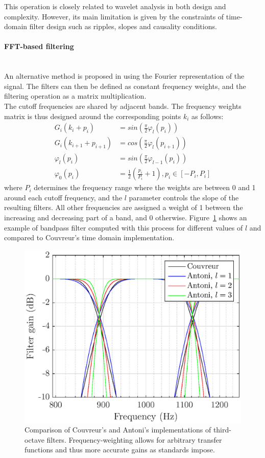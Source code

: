 \documentclass[12pt,times,onecolumn]{article}
\begin{document}
This operation is closely related to wavelet analysis in both design and complexity. However, its main limitation is given by the constraints of time-domain filter design such as ripples, slopes and causality conditions.

\paragraph{FFT-based filtering\\\\}
An alternative method is proposed in \cite{antoni2010} using the Fourier representation of the signal. The filters can then be defined as constant frequency weights, and the filtering operation as a matrix multiplication.\\

The cutoff frequencies are shared by adjacent bands. The frequency weights matrix is thus designed around the corresponding points $k_i$ as follows:
\begin{align}
G_i(k_i+p_i) &= sin\left(\frac{\pi}{2}\varphi_l(p_i)\right)\\
G_i(k_{i+1}+p_{i+1}) &= cos\left(\frac{\pi}{2}\varphi_l(p_{i+1})\right)\\
\varphi_l(p_i) &= sin\left(\frac{\pi}{2}\varphi_{l-1}(p_i)\right)\\
\varphi_0(p_i) &= \frac{1}{2}\left(\frac{p_i}{P_i}+1\right), p_i \in [-P_i, P_i]
\end{align}
where $P_i$ determines the frequency range where the weights are between 0 and 1 around each cutoff frequency, and the $l$ parameter controls the slope of the resulting filters. All other frequencies are assigned a weight of 1 between the increasing and decreasing part of a band, and 0 otherwise. Figure~\ref{fig:freq_filt} shows an example of bandpass filter computed with this process for different values of $l$ and compared to Couvreur's \cite{couvreur2004} time domain implementation.\\

\begin{figure}[htbp]
	\centering
		\includegraphics[width=0.5\columnwidth]{figures/tob_imp.eps}
	\caption{Comparison of Couvreur's and Antoni's implementations of third-octave filters. Frequency-weighting allows for arbitrary transfer functions and thus more accurate gains as standards impose.}
	\label{fig:freq_filt}
\end{figure}
\end{document}
